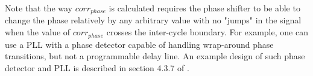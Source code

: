 Note that the way $corr_{phase}$ is calculated requires the phase shifter
to be able to change the phase relatively by any arbitrary value with
no "jumps" in the signal when the value of $corr_{phase}$ crosses the
inter-cycle boundary. For example, one can use a PLL with a phase detector
capable of handling wrap-around phase transitions, but not a programmable
delay line. An example design of such phase detector and PLL is described
in section 4.3.7 of \cite{tomekMSC}.

